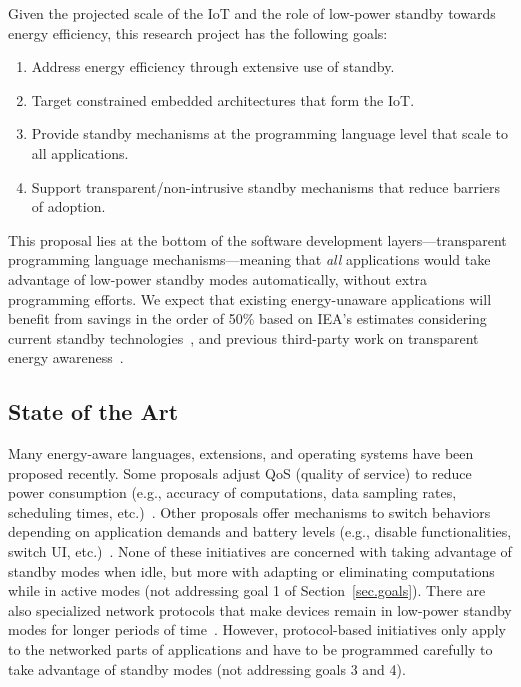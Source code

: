\documentclass[12pt,english]{amsart}
\begin{document}
Given the projected scale of the IoT and the role of low-power standby towards
energy efficiency, this research project has the following goals:

\begin{enumerate}
    \item Address energy efficiency through extensive use of standby.
    \item Target constrained embedded architectures that form the IoT.
    \item Provide standby mechanisms at the programming language level that scale to all applications.
    \item Support transparent/non-intrusive standby mechanisms that reduce barriers of adoption.
\end{enumerate}


This proposal lies at the bottom of the software development
layers---transparent programming language mechanisms---meaning that \emph{all}
applications would take advantage of low-power standby modes automatically,
without extra programming efforts.
%
We expect that existing energy-unaware applications will benefit from savings
in the order of 50\% based on IEA's estimates considering current standby
technologies~\cite{iea.data}, and previous third-party work on transparent energy
awareness~\cite{wsn.tos.2}.

\subsection{State of the Art}
\label{sec.related}

Many energy-aware languages, extensions, and operating systems have been
proposed recently.
%
Some proposals adjust QoS (quality of service) to reduce power consumption
(e.g., accuracy of computations, data sampling rates, scheduling times,
etc.)~\cite{os.ecosystem,os.odyssey.2,lang.green,lang.enerj,os.jouleguard,lang.lab,lang.flexjava,lang.greenweb}.
%
Other proposals offer mechanisms to switch behaviors depending on application
demands and battery levels (e.g., disable functionalities, switch UI,
etc.)~\cite{lang.eon,lang.energytypes,lang.gradual,lang.ent}.
%
None of these initiatives are concerned with taking advantage of standby modes
when idle,
but more with adapting or eliminating computations while in active modes (not
addressing goal 1 of Section~\ref{sec.goals}).
%
There are also specialized network protocols that make devices remain in
low-power standby modes for longer periods of time~\cite{wsn.energy}.
%
However, protocol-based initiatives only apply to the networked parts of
applications and have to be programmed carefully to take
advantage of standby modes (not addressing goals 3 and 4).
%
\end{document}
